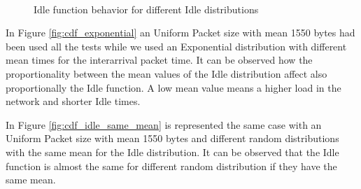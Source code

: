\begin{figure}[h]
	\centering
	\\
	\caption{Idle function behavior for different Idle distributions}
	\label{fig:cdf_p}
\end{figure}

In Figure \ref{fig:cdf_exponential} an Uniform Packet size with mean 1550 bytes had been used all the tests while we used an Exponential distribution with different mean times for the interarrival packet time. It can be observed how the proportionality between the mean values of the Idle distribution affect also proportionally the Idle function. A low mean value means a higher load in the network and shorter Idle times.

In Figure \ref{fig:cdf_idle_same_mean} is represented the same case with an Uniform Packet size with mean 1550 bytes and different random distributions with the same mean for the Idle distribution. It can be observed that the Idle function is almost the same for different random distribution if they have the same mean.


